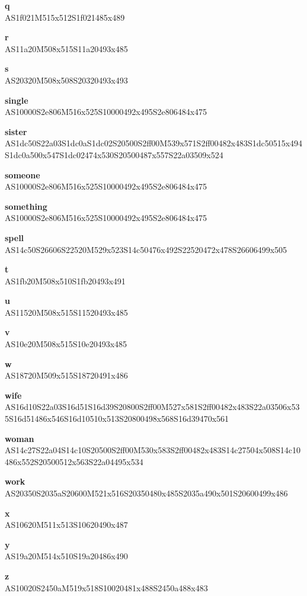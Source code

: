 \documentclass{article}
\begin{document}
\begin{glossary}
\textbf{q}\\
AS1f021M515x512S1f021485x489

\textbf{r}\\
AS11a20M508x515S11a20493x485

\textbf{s}\\
AS20320M508x508S20320493x493

\textbf{single}\\
AS10000S2e806M516x525S10000492x495S2e806484x475

\textbf{sister}\\
AS1dc50S22a03S1dc0aS1dc02S20500S2ff00M539x571S2ff00482x483S1dc50515x494S1dc0a500x547S1dc02474x530S20500487x557S22a03509x524

\textbf{someone}\\
AS10000S2e806M516x525S10000492x495S2e806484x475

\textbf{something}\\
AS10000S2e806M516x525S10000492x495S2e806484x475

\textbf{spell}\\
AS14c50S26606S22520M529x523S14c50476x492S22520472x478S26606499x505

\textbf{t}\\
AS1fb20M508x510S1fb20493x491

\textbf{u}\\
AS11520M508x515S11520493x485

\textbf{v}\\
AS10e20M508x515S10e20493x485

\textbf{w}\\
AS18720M509x515S18720491x486

\textbf{wife}\\
AS16d10S22a03S16d51S16d39S20800S2ff00M527x581S2ff00482x483S22a03506x535S16d51486x546S16d10510x513S20800498x568S16d39470x561

\textbf{woman}\\
AS14c27S22a04S14c10S20500S2ff00M530x583S2ff00482x483S14c27504x508S14c10486x552S20500512x563S22a04495x534

\textbf{work}\\
AS20350S2035aS20600M521x516S20350480x485S2035a490x501S20600499x486

\textbf{x}\\
AS10620M511x513S10620490x487

\textbf{y}\\
AS19a20M514x510S19a20486x490

\textbf{z}\\
AS10020S2450aM519x518S10020481x488S2450a488x483

\end{glossary}
\end{document}
